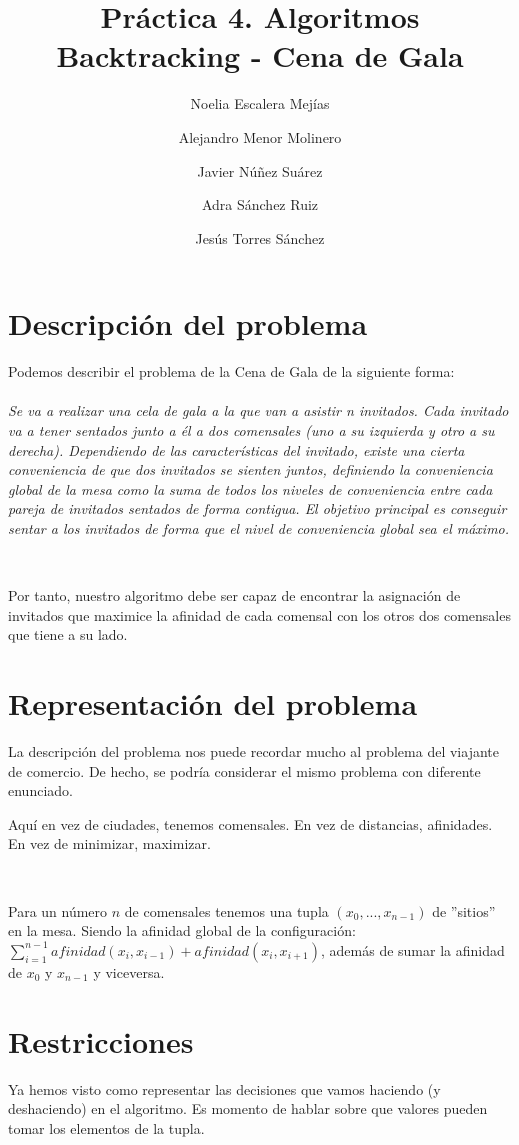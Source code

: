 \documentclass{article}
\title{Práctica 4. Algoritmos Backtracking - Cena de Gala}
\author{Noelia Escalera Mejías \\
	\and Alejandro Menor Molinero \\
	\and Javier Núñez Suárez \\
	\and Adra Sánchez Ruiz \\
	\and Jesús Torres Sánchez}
\begin{document}
	\maketitle
	\section{Descripción del problema}
	Podemos describir el problema de la Cena de Gala de la siguiente forma:
	\\ 
	\\
	\textit{Se va a realizar una cela de gala a la que van a asistir n invitados. Cada invitado va a tener sentados junto a él a dos comensales (uno a su izquierda y otro a su derecha). Dependiendo de las características del invitado, existe una cierta conveniencia de que dos invitados se sienten juntos, definiendo la conveniencia global de la mesa como la suma de todos los niveles de conveniencia entre cada pareja de invitados sentados de forma contigua. El objetivo principal es conseguir sentar a los invitados de forma que el nivel de conveniencia global sea el máximo.}
	
	\
	
	Por tanto, nuestro algoritmo debe ser capaz de encontrar la asignación de invitados que maximice la afinidad de cada comensal con los otros dos comensales que tiene a su lado.
	\section{Representación del problema}
	La descripción del problema nos puede recordar mucho al problema del viajante de comercio.
	De hecho, se podría considerar el mismo problema con diferente enunciado.
	\
	
	Aquí en vez de ciudades, tenemos comensales. En vez de distancias, afinidades. En vez de minimizar, maximizar.
	
	\
	
	Para un número $n$ de comensales tenemos una tupla $(x_0, ..., x_{n-1})$ de ''sitios'' en la mesa. Siendo la afinidad global de la configuración: $\sum_{i=1}^{n-1} afinidad(x_i, x_{i-1}) + afinidad(x_i, x_{i+1})$, además de sumar la afinidad de $x_0$ y $x_{n-1}$ y viceversa.
	
	\section{Restricciones}
	Ya hemos visto como representar las decisiones que vamos haciendo (y deshaciendo) en el algoritmo. Es momento de hablar sobre que valores pueden tomar los elementos de la tupla.
	
\end{document}
